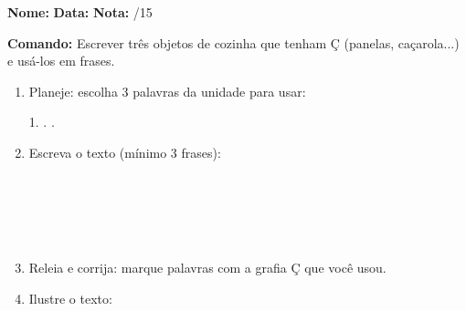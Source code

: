 

\begin{exercicio}

\noindent\textbf{Nome:} \underline{\hspace{3.2cm}} \quad \textbf{Data:} \underline{\hspace{1.6cm}} \quad \textbf{Nota:} \underline{\hspace{0.9cm}}/15


\noindent\textbf{Comando:} Escrever três objetos de cozinha que tenham Ç (panelas, caçarola...) e usá-los em frases.


\begin{enumerate}

  \item Planeje: escolha 3 palavras da unidade para usar:
  \begin{center}
  1. \underline{\hspace{3cm}} . \underline{\hspace{3cm}} . \underline{\hspace{3cm}}
  \end{center}

  \item Escreva o texto (mínimo 3 frases):
  \begin{center}
  \underline{\hspace{12cm}}\\\underline{\hspace{12cm}}\\\underline{\hspace{12cm}}\\\underline{\hspace{12cm}}\\\underline{\hspace{12cm}}
  \end{center}

  \item Releia e corrija: marque palavras com a grafia Ç que você usou.

  \item Ilustre o texto:
  \begin{center}
  \end{center}

\end{enumerate}

\end{exercicio}

